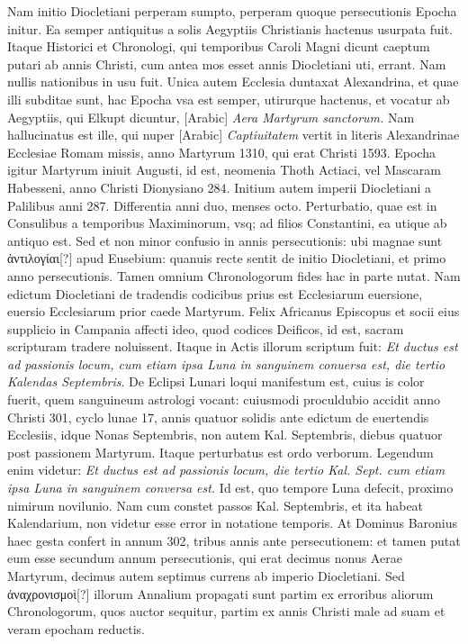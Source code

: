 Nam initio Diocletiani perperam sumpto, perperam quoque
persecutionis Epocha initur.
Ea semper antiquitus a solis Aegyptiis
Christianis hactenus usurpata fuit.
Itaque Historici et Chronologi,
qui temporibus Caroli Magni dicunt caeptum putari ab annis
Christi, cum antea mos esset annis Diocletiani uti, errant.
Nam
nullis nationibus in usu fuit.
Unica autem Ecclesia duntaxat Alexandrina,
et quae illi subditae sunt, hac Epocha vsa est semper, utirurque
hactenus, et vocatur ab Aegyptiis, qui Elkupt dicuntur,
\textarabic{[Arabic]} \textit{Aera Martyrum sanctorum.}
Nam
hallucinatus est ille, qui nuper \textarabic{[Arabic]}
\textit{Captiuitatem} vertit in literis
Alexandrinae Ecclesiae Romam missis, anno Martyrum 1310, qui
erat Christi 1593.
Epocha igitur Martyrum iniuit  Augusti,
id est, neomenia Thoth Actiaci, vel Mascaram Habesseni, anno Christi
Dionysiano 284.
Initium autem imperii Diocletiani a Palilibus
anni 287.
Differentia anni duo, menses octo.
Perturbatio, quae est in
Consulibus a temporibus Maximinorum, vsq; ad filios Constantini,
ea utique ab antiquo est.
Sed et non minor confusio in annis persecutionis:
ubi magnae sunt \textgreek{ἀντιλογίαι[?]} apud Eusebium: quanuis
recte sentit de initio Diocletiani, et primo anno persecutionis.
Tamen
omnium Chronologorum fides hac in parte nutat.
Nam edictum
Diocletiani de tradendis codicibus prius est Ecclesiarum euersione,
euersio Ecclesiarum prior caede Martyrum.
Felix Africanus Episcopus
et socii eius supplicio in Campania affecti ideo, quod codices
Deificos, id est, sacram scripturam tradere noluissent.
Itaque in
Actis illorum scriptum fuit: \textit{Et ductus est ad passionis locum, cum etiam
ipsa Luna in sanguinem conuersa est, die tertio Kalendas Septembris}.
De Eclipsi
Lunari loqui manifestum est, cuius is color fuerit, quem sanguineum
astrologi vocant: cuiusmodi proculdubio accidit anno Christi
301, cyclo lunae 17, annis quatuor solidis ante edictum de euertendis
Ecclesiis, idque  Nonas Septembris, non autem  Kal.
Septembris, diebus quatuor post passionem Martyrum.
Itaque perturbatus
est ordo verborum.
Legendum enim videtur: \textit{Et ductus est ad passionis
locum, die tertio Kal. Sept. cum etiam ipsa Luna in sanguinem conversa
est.}
Id est, quo tempore Luna defecit, proximo nimirum novilunio.
Nam cum constet passos  Kal. Septembris, et ita habeat
Kalendarium, non videtur esse error in notatione temporis.
At Dominus Baronius haec gesta confert in annum 302, tribus annis ante
persecutionem: et tamen putat eum esse secundum annum persecutionis,
qui erat decimus nonus Aerae Martyrum, decimus autem
septimus currens ab imperio Diocletiani.
Sed \textgreek{ἀναχρονισμοὶ[?]} illorum
Annalium propagati sunt partim ex erroribus aliorum Chronologorum,
quos auctor sequitur, partim ex annis Christi male ad
suam et veram epocham reductis.

